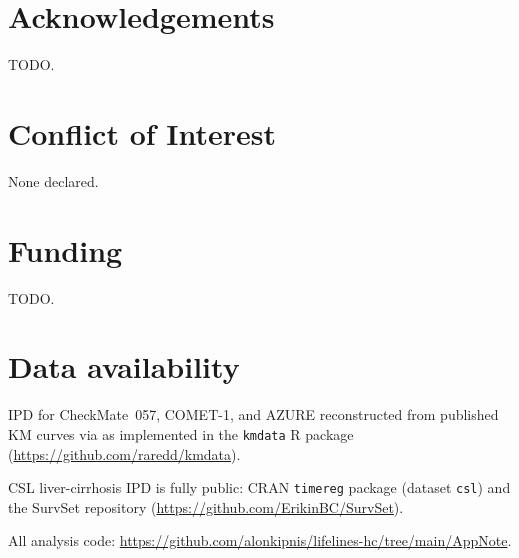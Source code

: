 \documentclass[unnumsec,webpdf,contemporary,large]{oup-authoring-template}
\let\origitemize\itemize
\let\origenditemize\enditemize
\renewenvironment{itemize}{%
  \origitemize
  \setlength{\itemsep}{1pt}%
  \setlength{\parskip}{0pt}%
  \setlength{\topsep}{3pt}%
}{\origenditemize}
\begin{document}
\section*{Acknowledgements}
TODO.

\section*{Conflict of Interest}
None declared.

\section*{Funding}
TODO.

\section*{Data availability}
\begin{itemize}
  \item IPD for CheckMate~057, COMET-1, and AZURE reconstructed from
        published KM curves via \citet{guyot2012} as implemented in the
        \texttt{kmdata} R package (\url{https://github.com/raredd/kmdata}).
  \item CSL liver-cirrhosis IPD is fully public: CRAN \texttt{timereg}
        package (dataset \texttt{csl}) and the SurvSet repository
        \citep{survset2022} (\url{https://github.com/ErikinBC/SurvSet}).
  \item All analysis code:
        \url{https://github.com/alonkipnis/lifelines-hc/tree/main/AppNote}.
\end{itemize}


\end{document}
